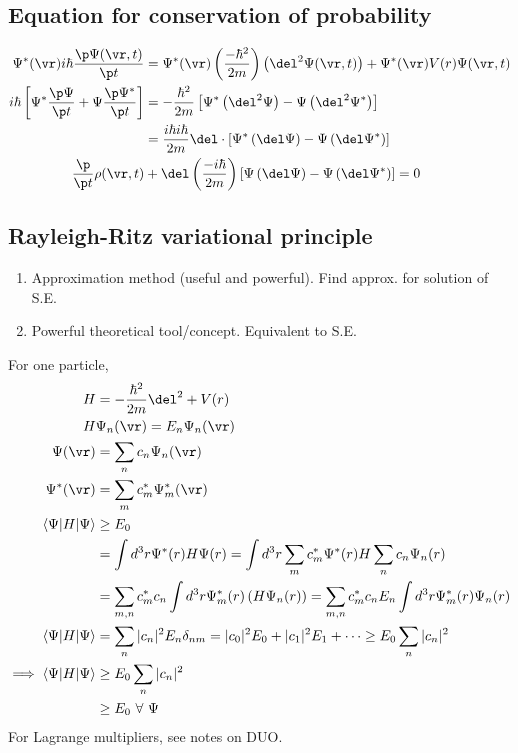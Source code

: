\documentclass[a4paper, 11pt, normalem]{report}
\begin{document}
\chapter{}
\section{Equation for conservation of probability}
\begin{align}
    \Psi^*(\vr)i\hbar\frac{\p\Psi(\vr,t)}{\p t} &= \Psi^*(\vr)\left(\frac{-\hbar^2}{2m}\right)\left(\del^2\Psi(\vr,t)\right) + \Psi^*(\vr)V(r)\Psi(\vr,t) \\
    i\hbar\left[\Psi^*\frac{\p\Psi}{\p t} + \Psi\frac{\p\Psi^*}{\p t}\right] &= -\frac{\hbar^2}{2m}\left[\Psi^*\left(\del^2\Psi\right) - \Psi\left(\del^2\Psi^*\right)\right] \\
                                                                             &= \frac{i\hbar i\hbar}{2m}\del\cdot\left[\Psi^*\left(\del\Psi\right) - \Psi\left(\del\Psi^*\right)\right] \\
    \frac{\p}{\p t}\rho(\vr,t) &+ \del\left(\frac{-i\hbar}{2m}\right)\left[\Psi\left(\del\Psi\right) - \Psi\left(\del\Psi^*\right)\right] = 0
\end{align}

\section{Rayleigh-Ritz variational principle}
\begin{enumerate}
    \item Approximation method (useful and powerful). Find approx. for solution of S.E.
    \item Powerful theoretical tool/concept. Equivalent to S.E.
\end{enumerate}

For one particle,
\begin{align}
    H &= -\frac{\hbar^2}{2m}\del^2 + V(r) \\
    H&\Psi_n(\vr) = E_n\Psi_n(\vr) \\
    \Psi(\vr) &= \sum_n c_n\Psi_n(\vr) \\
    \Psi^*(\vr) &= \sum_m c^*_m\Psi^*_m(\vr) \\
    \langle\Psi|H|\Psi\rangle &\geq E_0 \\
                              &= \int d^3r \Psi^*(r) H \Psi(r) = \int d^3r \sum_m c^*_m\Psi^*(r) H \sum_nc_n\Psi_n(r) \\
                              &= \sum_{m,n} c_m^*c_n \int d^3r \Psi^*_m(r) \left(H\Psi_n(r)\right) = \sum_{m,n} c_m^*c_nE_n \int d^3r \Psi^*_m(r)\Psi_n(r) \\
    \langle\Psi|H|\Psi\rangle &= \sum_n |c_n|^2E_n \delta_{nm} = |c_0|^2E_0 + |c_1|^2E_1 + \dots \geq E_0\sum_n |c_n|^2 \\
    \implies \langle\Psi|H|\Psi\rangle &\geq E_0\sum_n |c_n|^2 \\
                                       &\geq E_0 ~\forall ~ \Psi
\end{align}
For Lagrange multipliers, see notes on DUO.
\end{document}
